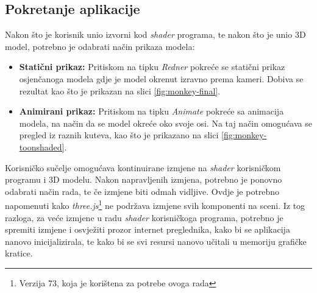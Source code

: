 \subsection{Pokretanje aplikacije}

Nakon što je korisnik unio izvorni kod \emph{shader} programa, te nakon što je unio 3D model, potrebno je odabrati način prikaza modela:

\begin{itemize}
\item \textbf{Statični prikaz:} Pritiskom na tipku \emph{Redner} pokreće se statični prikaz osjenčanoga modela gdje je model okrenut izravno prema kameri. Dobiva se rezultat kao što je prikazan na slici \ref{fig:monkey-final}.

\item \textbf{Animirani prikaz:} Pritiskom na tipku \emph{Animate} pokreće sa animacija modela, na način da se model okreće oko svoje osi. Na taj način omogućava se pregled iz raznih kuteva, kao što je prikazano na slici \ref{fig:monkey-toonshaded}.
\end{itemize}

Korisničko sučelje omogućava kontinuirane izmjene na \emph{shader} korisničkom programu i 3D modelu. Nakon napravljenih izmjena, potrebno je ponovno odabrati način rada, te če izmjene biti odmah vidljive. Ovdje je potrebno napomenuti kako \emph{three.js}\footnote{Verzija 73, koja je korištena za potrebe ovoga rada} ne podržava izmjene svih komponenti na sceni. Iz tog razloga, za veće izmjene u radu \emph{shader} korisničkoga programa, potrebno je spremiti izmjene i osvježiti prozor internet preglednika, kako bi se aplikacija nanovo inicijalizirala, te kako bi se svi resursi nanovo učitali u memoriju grafičke kratice.
